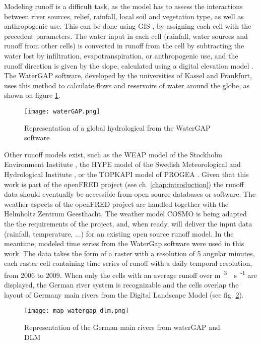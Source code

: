 \label{sec:mod_runoff}
Modeling runoff is a difficult task, as the model has to assess the interactions between river sources, relief, rainfall, local soil and vegetation type, as well as anthropogenic use. This can be done using GIS \cite{bayazit}, by assigning each cell with the precedent parameters. The water input in each cell (rainfall, water sources and runoff from other cells) is converted in runoff from the cell by subtracting the water lost by infiltration, evapotranspiration, or anthropogenic use, and the runoff direction is given by the slope, calculated using a digital elevation model \cite{heywood}. \newline
The WaterGAP software, developed by the universities of Kassel and Frankfurt, uses this method to calculate flows and reservoirs of water around the globe, as shown on figure \ref{waterGAP}.
\begin{figure}[H]
\centering
\texttt{[image: waterGAP.png]}
\caption[Representation of a global hydrological from the WaterGAP software]{Representation of a global hydrological from the WaterGAP software \cite{doll}}
\label{waterGAP}
\end{figure}
Other runoff models exist, such as the WEAP model of the Stockholm Environment Institute \cite{weap}, the HYPE model of the Swedish Meteorological and Hydrological Institute \cite{hype}, or the TOPKAPI model of PROGEA \cite{topkapi}. \newline
Given that this work is part of the openFRED project (see ch. \ref{chap:introduction}) the runoff data should eventually be accessible from open source databases or software. The weather aspects of the openFRED project are handled together with the Helmholtz Zentrum Geesthacht. The weather model COSMO is being adapted the the requirements of the project, and, when ready, will deliver the input data (rainfall, temperature, ...) for an existing open source runoff model. \newline
In the meantime, modeled time series from the WaterGap software were used in this work. The data takes the form of a raster with a resolution of 5 angular minutes, each raster cell containing time series of runoff with a daily temporal resolution, from 2006 to 2009. When only the cells with an average runoff over \unit[100]{m\textsuperscript{3}\textperiodcentered s\textsuperscript{-1}} are displayed, the German river system is recognizable and the cells overlap the layout of Germany main rivers from the Digital Landscape Model \cite{dlm250} (see fig. \ref{map_watergap_dlm}).

\begin{figure}[H]
\centering
\texttt{[image: map\_watergap\_dlm.png]}
\caption[Representation of the German main rivers from waterGAP and DLM]{Representation of the German main rivers from waterGAP and DLM}
\label{map_watergap_dlm}
\end{figure}
